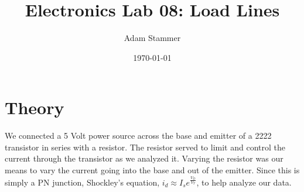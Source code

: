 \documentclass[prb,preprint]{revtex4-1}
\begin{document}
\title{Electronics Lab 08: Load Lines}
\author{Adam Stammer}

\date{\today}


\maketitle


%
%
%
%
%
%
%
%

\section{Theory}

We connected a 5 Volt power source across the base and emitter of a 2222 transistor in series with a resistor. The resistor served to limit and control the current through the transistor as we analyzed it. Varying the resistor was our means to vary the current going into the base and out of the emitter. Since this is simply a PN junction, Shockley's equation, $i_{d} \approx I_{s}e^{\frac{V_{D}}{V_{T}}}$, to help analyze our data. 
\end{document}
